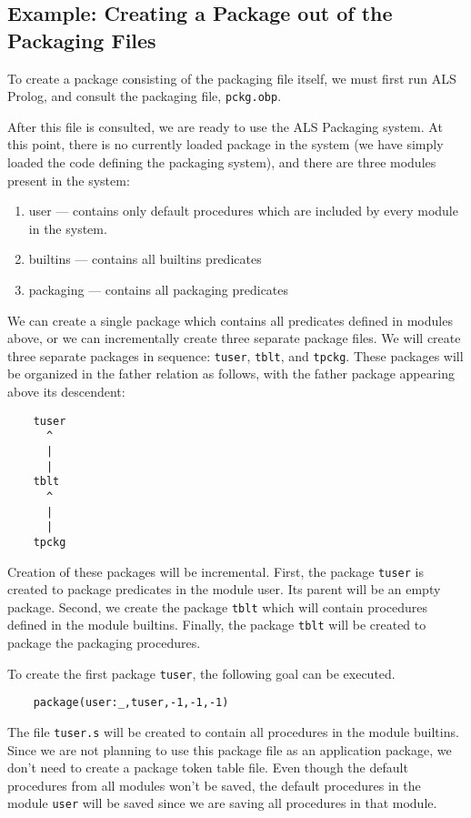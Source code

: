 \subsection{Example: Creating a Package out of the Packaging Files}

To create a package consisting of the packaging file itself, we must first 
run ALS Prolog, and consult the packaging file, \verb|pckg.obp|.

After this  file is consulted, we are ready to use the
ALS Packaging system. At this point, there is no currently loaded package in the system
(we have simply loaded the code defining the packaging system), and
there are three modules present in the system:

\begin{enumerate}
\item
user --- contains only default procedures which are included by every module in the system.
\item
builtins --- contains all builtins predicates
\item
packaging --- contains all packaging predicates
\end{enumerate}

We can create a single package which contains all predicates defined in
modules above, or we can incrementally create three separate package files. 
We will create three separate packages in sequence: \verb|tuser|, \verb|tblt|, and \verb|tpckg|. 
These packages will be organized in the father relation as follows, with the father package
appearing above its descendent:

\begin{verbatim}
    tuser
      ^
      |
      |
    tblt
      ^
      |
      |
    tpckg
\end{verbatim}

Creation of these packages will be incremental.
First, the package \verb|tuser| is created to package predicates in the
module user. Its parent will be an empty package. Second,
we create the package \verb|tblt| which will contain procedures defined
in the module builtins. Finally, the package \verb|tblt| will be created to package
the packaging procedures.

To create the first package \verb|tuser|, the following goal can be executed.

\begin{verbatim}
    package(user:_,tuser,-1,-1,-1)
\end{verbatim}

The file \verb|tuser.s| will be created to contain all procedures in 
the module builtins. Since we are not planning to use this package file
as an application package, we don't need to create a package token
table file. Even though the default procedures from all modules won't be saved,
the default procedures in the module \verb|user| will be saved since we are
saving all procedures in that module.

